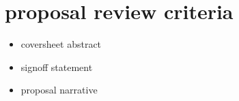 \documentclass[]{article}
\begin{document}
\section{proposal review criteria}
\begin{itemize}
	\item coversheet abstract
	\item signoff statement %
	\item proposal narrative
\end{itemize}

\end{document}
